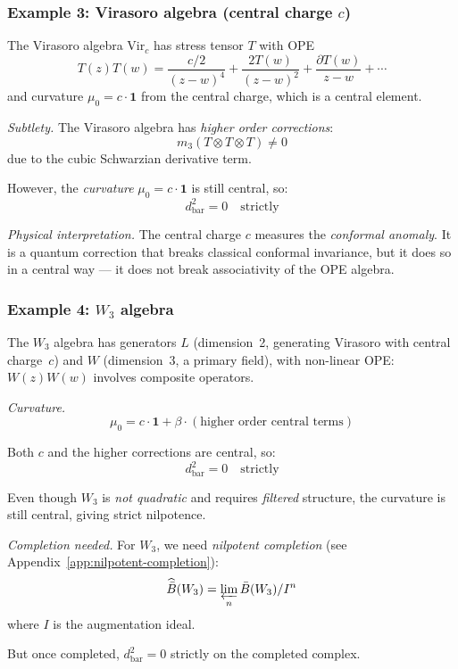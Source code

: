 \subsubsection{\texorpdfstring{Example 3: Virasoro algebra (central charge $c$)}{Example 3: Virasoro algebra (central charge c)}}

\begin{example}\label{ex:virasoro-strict}
The Virasoro algebra $\text{Vir}_c$ has stress tensor $T$ with OPE
\[T(z)T(w) = \frac{c/2}{(z-w)^4} + \frac{2T(w)}{(z-w)^2} + \frac{\partial T(w)}{z-w} + \cdots\]
and curvature $\mu_0 = c \cdot \mathbf{1}$ from the central charge, which is a central element.

\emph{Subtlety.} The Virasoro algebra has \emph{higher order corrections}:
\[m_3(T \otimes T \otimes T) \neq 0\]
due to the cubic Schwarzian derivative term.

However, the \emph{curvature} $\mu_0 = c \cdot \mathbf{1}$ is still central, so:
\[d_{\text{bar}}^2 = 0 \quad \text{strictly}\]

\emph{Physical interpretation.}
The central charge $c$ measures the \emph{conformal anomaly}. It is a quantum correction
that breaks classical conformal invariance, but it does so in a central way ---
it does not break associativity of the OPE algebra.
\end{example}

\subsubsection{\texorpdfstring{Example 4: $W_3$ algebra}{Example 4: W-3 algebra}}

\begin{example}\label{ex:w3-strict}
The $W_3$ algebra has generators $L$ (dimension~2, generating Virasoro with central charge~$c$) and $W$ (dimension~3, a primary field), with non-linear OPE: $W(z)W(w)$ involves composite operators.

\emph{Curvature.}
\[\mu_0 = c \cdot \mathbf{1} + \beta \cdot (\text{higher order central terms})\]

Both $c$ and the higher corrections are central, so:
\[d_{\text{bar}}^2 = 0 \quad \text{strictly}\]

Even though $W_3$ is \emph{not quadratic} and requires \emph{filtered}
structure, the curvature is still central, giving strict nilpotence.

\emph{Completion needed.}
For $W_3$, we need \emph{nilpotent completion} (see Appendix~\ref{app:nilpotent-completion}):
\[\widehat{\bar{B}}(W_3) = \varprojlim_n \bar{B}(W_3)/I^n\]
where $I$ is the augmentation ideal.

But once completed, $d_{\text{bar}}^2 = 0$ strictly on the completed complex.
\end{example}

